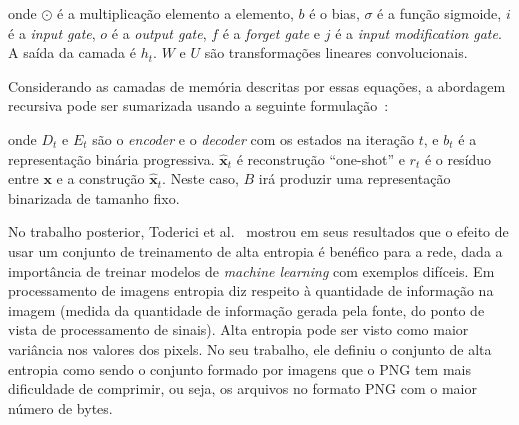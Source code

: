 \noindent onde $\odot$ é a multiplicação elemento a elemento, $b$ é o bias, $\sigma$ é a função sigmoide, $i$ é a \textit{input gate}, $o$ é a \textit{output gate}, $f$ é a \textit{forget gate} e $j$ é a \textit{input modification gate}. A saída da camada é $h_t$. $W$ e $U$ são transformações lineares convolucionais.

Considerando as camadas de memória descritas por essas equações, a abordagem recursiva pode ser sumarizada usando a seguinte formulação~\cite{toderici2017}:

\noindent onde $D_t$ e $E_t$ são o \textit{encoder} e o \textit{decoder} com os estados na iteração $t$, e $b_t$ é a representação binária progressiva. $\hat{\mathbf{x}}_t$ é reconstrução ``one-shot'' e $r_t$ é o resíduo entre $\mathbf{x}$ e a construção $\hat{\mathbf{x}}_t$. Neste caso, $B$ irá produzir uma representação binarizada de tamanho fixo.

No trabalho posterior, Toderici et al.~\cite{toderici2017} mostrou em seus resultados que o efeito de usar um conjunto de treinamento de alta entropia é benéfico para a rede, dada a importância de treinar modelos de \textit{machine learning} com exemplos difíceis. Em processamento de imagens entropia diz respeito à quantidade de informação na imagem (medida da quantidade de informação gerada pela fonte, do ponto de vista de processamento de sinais). Alta entropia pode ser visto como maior variância nos valores dos pixels. No seu trabalho, ele definiu o conjunto de alta entropia como sendo o conjunto formado por imagens que o \acrshort{PNG} tem mais dificuldade de comprimir, ou seja, os arquivos no formato \acrshort{PNG} com o maior número de bytes. 


